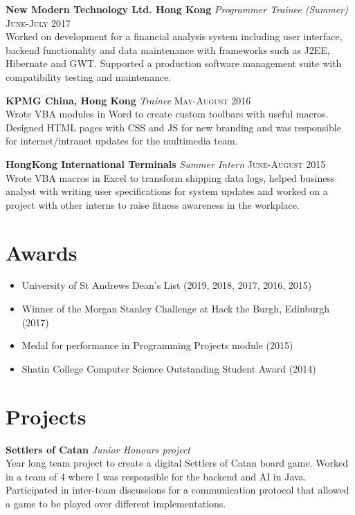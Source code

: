 \documentclass{article}
\begin{document}
\textbf{New Modern Technology Ltd. Hong Kong} \textit{Programmer Trainee (Summer)}
\hfill
\textsc{June-July 2017} \\
Worked on development for a financial analysis system including user interface,
backend functionality and data maintenance with frameworks such as J2EE, Hibernate and GWT.
Supported a production software management suite with compatibility testing and maintenance.

\textbf{KPMG China, Hong Kong} \textit{Trainee}
\hfill
\textsc{May-August 2016} \\
Wrote VBA modules in Word to create custom toolbars with useful macros.
Designed HTML pages with CSS and JS for new branding and was responsible for
internet/intranet updates for the multimedia team.

\textbf{HongKong International Terminals} \textit{Summer Intern}
\hfill
\textsc{June-August 2015} \\
Wrote VBA macros in Excel to transform shipping data logs, helped business analyst
with writing user specifications for system updates and worked on a project with other
interns to raise fitness awareness in the workplace.

\section*{Awards}
\setlength\multicolsep{0pt}
\begin{multicols}{2}
\begin{itemize}
\item University of St Andrews Dean's List (2019, 2018, 2017, 2016, 2015)
\item Winner of the Morgan Stanley Challenge at Hack the Burgh, Edinburgh (2017)
\end{itemize}
\columnbreak
\begin{itemize}
\item Medal for performance in Programming Projects module (2015)
\item Shatin College Computer Science Outstanding Student Award (2014)
\end{itemize}
\end{multicols}


\section*{Projects}
\textbf{Settlers of Catan} \textit{Junior Honours project} \\
Year long team project to create a digital Settlers of Catan board game.
Worked in a team of 4 where I was responsible for the backend and AI in Java.
Participated in inter-team discussions for a communication protocol that allowed a game
to be played over different implementations.
\end{document}
